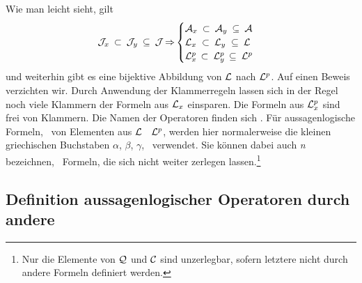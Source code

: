 Wie man leicht sieht, gilt
\begin{equation}
	\mathcal{J}_x     \: \subset \: \mathcal{J}_y \: \subseteq \: \mathcal{J} \operatorname{\Rightarrow}
	\begin{cases}
		\mathcal{A}_x \: \subset \: \mathcal{A}_y \: \subseteq \: \mathcal{A} \\
		\mathcal{L}_x \; \subset \: \mathcal{L}_y \; \subseteq \: \mathcal{L} \\
		\mathcal{L}_x^p\, \subset \: \mathcal{L}_y^p\, \subseteq \: \mathcal{L}^p
	\end{cases}
\end{equation}
und weiterhin gibt es eine bijektive Abbildung von $\mathcal{L}$ nach $\mathcal{L}^p$. Auf einen Beweis verzichten wir.
%
Durch Anwendung der Klammerregeln  lassen sich in der Regel noch viele Klammern der Formeln aus $\mathcal{L}_x$ einsparen.
Die Formeln aus $\mathcal{L}_x^p$ sind frei von Klammern.
Die Namen der Operatoren finden sich .
Für aussagenlogische Formeln, \textdh\ von Elementen aus $\mathcal{L}$ \textbzgl\ $\mathcal{L}^p$, werden hier normalerweise die kleinen griechischen Buchstaben $\alpha$, $\beta$, $\gamma$, \textusw\ verwendet.
Sie können dabei auch \emph{n} bezeichnen, \textdh\ Formeln, die sich nicht weiter zerlegen lassen.\footnote{%
	Nur die Elemente von $\mathcal{Q}$ und $\mathcal{C}$ sind unzerlegbar, sofern letztere nicht durch andere Formeln definiert werden.%
}

\subsection{Definition aussagenlogischer Operatoren durch andere}%
\label{sub:ausOperatorDef}


